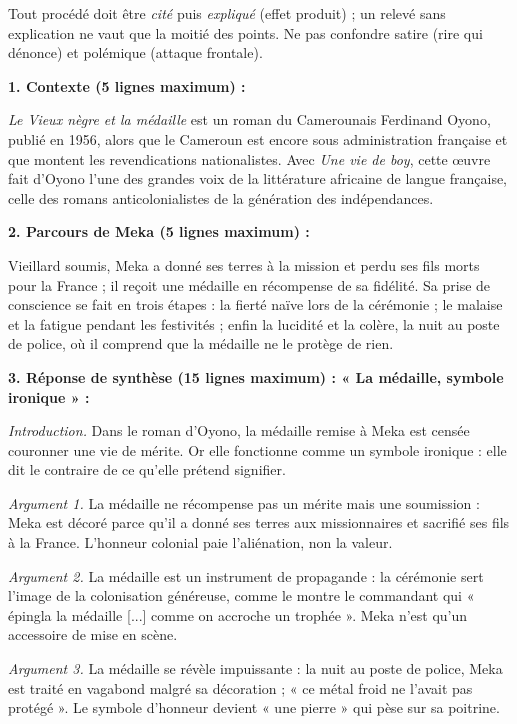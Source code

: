 \documentclass[11pt]{article}
\begin{document}
\begin{attention}
Tout procédé doit être \emph{cité} puis \emph{expliqué} (effet produit) ; un relevé sans explication ne vaut que la moitié des points. Ne pas confondre satire (rire qui dénonce) et polémique (attaque frontale).
\end{attention}

\begin{corrige}
\textbf{1. Contexte (5 lignes maximum) :}

\emph{Le Vieux nègre et la médaille} est un roman du Camerounais Ferdinand Oyono, publié en 1956, alors que le Cameroun est encore sous administration française et que montent les revendications nationalistes. Avec \emph{Une vie de boy}, cette œuvre fait d'Oyono l'une des grandes voix de la littérature africaine de langue française, celle des romans anticolonialistes de la génération des indépendances.

\textbf{2. Parcours de Meka (5 lignes maximum) :}

Vieillard soumis, Meka a donné ses terres à la mission et perdu ses fils morts pour la France ; il reçoit une médaille en récompense de sa fidélité. Sa prise de conscience se fait en trois étapes : la fierté naïve lors de la cérémonie ; le malaise et la fatigue pendant les festivités ; enfin la lucidité et la colère, la nuit au poste de police, où il comprend que la médaille ne le protège de rien.

\textbf{3. Réponse de synthèse (15 lignes maximum) : « La médaille, symbole ironique » :}

\emph{Introduction.} Dans le roman d'Oyono, la médaille remise à Meka est censée couronner une vie de mérite. Or elle fonctionne comme un symbole ironique : elle dit le contraire de ce qu'elle prétend signifier.

\emph{Argument 1.} La médaille ne récompense pas un mérite mais une soumission : Meka est décoré parce qu'il a donné ses terres aux missionnaires et sacrifié ses fils à la France. L'honneur colonial paie l'aliénation, non la valeur.

\emph{Argument 2.} La médaille est un instrument de propagande : la cérémonie sert l'image de la colonisation généreuse, comme le montre le commandant qui « épingla la médaille [...] comme on accroche un trophée ». Meka n'est qu'un accessoire de mise en scène.

\emph{Argument 3.} La médaille se révèle impuissante : la nuit au poste de police, Meka est traité en vagabond malgré sa décoration ; « ce métal froid ne l'avait pas protégé ». Le symbole d'honneur devient « une pierre » qui pèse sur sa poitrine.


\end{corrige}
\end{document}

